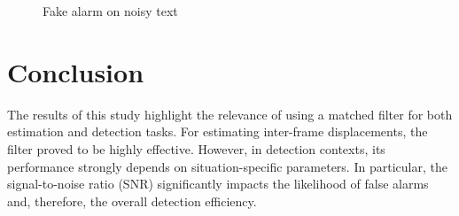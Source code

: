 \begin{figure}[h]
    \centering
	\caption{Fake alarm on noisy text}
\end{figure}
\pagebreak

\section{Conclusion}

The results of this study highlight the relevance of using a matched filter for both estimation and detection tasks. For estimating inter-frame displacements, the filter proved to be highly effective. However, in detection contexts, its performance strongly depends on situation-specific parameters. In particular, the signal-to-noise ratio (SNR) significantly impacts the likelihood of false alarms and, therefore, the overall detection efficiency.